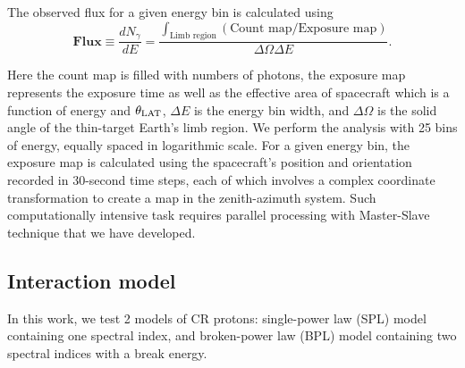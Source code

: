 The observed flux for a given energy bin is calculated using
\begin{equation}
    \textbf{Flux} \equiv \frac{dN_\gamma}{dE} = \frac{\int_{\textrm{Limb region}}(\textrm{Count map}/\textrm{Exposure map})}{\Delta\Omega\Delta E }
    .\label{flux_definition}
\end{equation}

Here the count map is filled with numbers of photons, the exposure map represents 
the exposure time as well as the effective area of spacecraft 
which is a function of energy and $\theta_{\rm LAT}$, $\Delta E$ is the energy bin width,
and $\Delta\Omega$ is the solid angle of the thin-target Earth's limb region.
We perform the analysis with 25 bins of energy, equally spaced in logarithmic scale.
For a given energy bin, the exposure map is calculated using the spacecraft's position
and orientation recorded in 30-second time steps, each of which involves a complex
coordinate transformation to create a map in the zenith-azimuth system.
Such computationally intensive task requires parallel
processing with Master-Slave technique that we have developed.


\subsection{Interaction model}
In this work, we test 2 models of CR protons: single-power law (SPL) model
containing one spectral index, and broken-power law (BPL) model containing two
spectral indices with a break energy.


